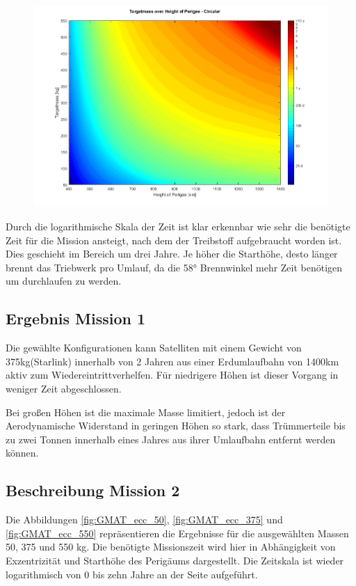 \begin{figure}[h!]
	\centering
		\includegraphics[width=1.00\textwidth]{./graphics/GMAT/GMAT_Mass_over_Height_550.png}
	\label{fig:GMAT_Mass_over_Height_550}
\end{figure}


Durch die logarithmische Skala der Zeit ist klar erkennbar wie sehr die benötigte Zeit für die Mission ansteigt, nach dem der Treibstoff aufgebraucht worden ist. Dies geschieht im Bereich um drei Jahre. Je höher die Starthöhe, desto länger brennt das Triebwerk pro Umlauf, da die 58° Brennwinkel mehr Zeit benötigen um durchlaufen zu werden. 

\subsection{Ergebnis Mission 1}
Die gewählte Konfigurationen kann Satelliten mit einem Gewicht von 375kg(Starlink) innerhalb von 2 Jahren aus einer Erdumlaufbahn von 1400km aktiv zum Wiedereintrittverhelfen. Für niedrigere Höhen ist dieser Vorgang in weniger Zeit abgeschlossen. 


Bei großen Höhen ist die maximale Masse limitiert, jedoch ist der Aerodynamische Widerstand in geringen Höhen so stark, dass Trümmerteile bis zu zwei Tonnen innerhalb eines Jahres aus ihrer Umlaufbahn entfernt werden können. 

\subsection{Beschreibung Mission 2}

Die Abbildungen \ref{fig:GMAT_ecc_50}, \ref{fig:GMAT_ecc_375} und \ref{fig:GMAT_ecc_550} repräsentieren die Ergebnisse für die ausgewählten Massen 50, 375 und 550 kg. Die benötigte Missionszeit wird hier in Abhängigkeit von Exzentrizität und Starthöhe des Perigäums dargestellt. Die Zeitskala ist wieder logarithmisch von 0 bis zehn Jahre an der Seite aufgeführt.


